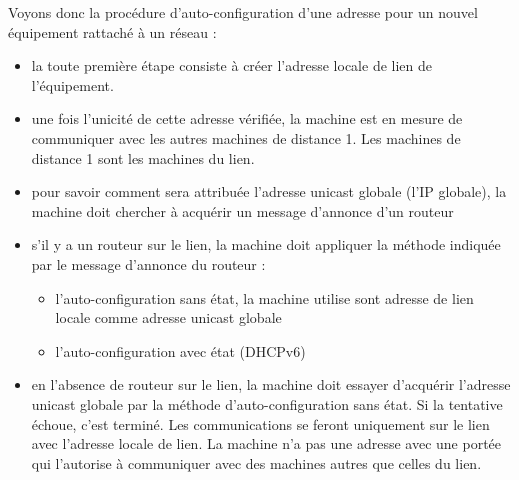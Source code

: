 Voyons donc la procédure d’auto-configuration d’une adresse pour un nouvel équipement rattaché à un réseau :
\begin{itemize}
\item la toute première étape consiste à créer l'adresse locale de lien de l’équipement.
\item une fois l'unicité de cette adresse vérifiée, la machine est en mesure de communiquer avec les autres machines de distance 1. Les machines de distance 1 sont les machines du lien.
\item pour savoir comment sera attribuée l’adresse unicast globale (l’IP globale), la machine doit chercher à acquérir un message d'annonce d’un routeur
\item s'il y a un routeur sur le lien, la machine doit appliquer la méthode indiquée par le message d'annonce du routeur :
\begin{itemize}
\item l'auto-configuration sans état, la machine utilise sont adresse de lien locale comme adresse unicast globale
\item l'auto-configuration avec état (DHCPv6)
\end{itemize}
\item en l'absence de routeur sur le lien, la machine doit essayer d'acquérir l'adresse unicast globale par la méthode d'auto-configuration sans état. Si la tentative échoue, c'est terminé. Les communications se feront uniquement sur le lien avec l'adresse locale de lien. La machine n'a pas une adresse avec une portée qui l'autorise à communiquer avec des machines autres que celles du lien.
\end{itemize}
